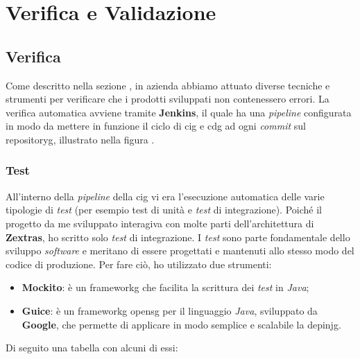 \section{Verifica e Validazione}
\subsection{Verifica}
Come descritto nella sezione , in azienda abbiamo attuato diverse tecniche e strumenti per verificare che i prodotti sviluppati non contenessero errori. La verifica automatica avviene tramite \textbf{Jenkins}, il quale ha una \textit{pipeline} configurata in modo da mettere in funzione il ciclo di \gls{cig} e \gls{cdg} ad ogni \textit{commit} sul \gls{repositoryg}, illustrato nella figura .
\subsubsection{Test}
All'interno della \textit{pipeline} della \gls{cig} vi era l'esecuzione automatica delle varie tipologie di \textit{test} (per esempio test di unità e \textit{test} di integrazione). Poiché il progetto da me sviluppato interagiva con molte parti dell'architettura di \textbf{Zextras}, ho scritto solo \textit{test} di integrazione. I \textit{test} sono parte fondamentale dello sviluppo \textit{software} e meritano di essere progettati e mantenuti allo stesso modo del codice di produzione. Per fare ciò, ho utilizzato due strumenti:
\begin{itemize}
    \item \textbf{Mockito}: è un \gls{frameworkg} che facilita la scrittura dei \textit{test} in \textit{Java}; 
    \item \textbf{Guice}: è un \gls{frameworkg} \gls{opensg} per il linguaggio \textit{Java}, sviluppato da \textbf{Google}, che permette di applicare in modo semplice e scalabile la \gls{depinjg}.
\end{itemize}
Di seguito una tabella con alcuni di essi:

